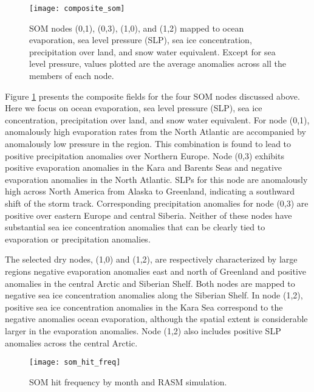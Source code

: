 \begin{figure}
  \centering
  \texttt{[image: composite\_som]}
  \caption{SOM nodes (0,1), (0,3), (1,0), and (1,2) mapped to ocean evaporation, sea level pressure (SLP), sea ice concentration, precipitation over land, and snow water equivalent. Except for sea level pressure, values plotted are the average anomalies across all the members of each node.}
  \label{fig:composite_som}
\end{figure}

Figure \ref{fig:composite_som} presents the composite fields for the four SOM nodes discussed above.
Here we focus on ocean evaporation, sea level pressure (SLP), sea ice concentration, precipitation over land, and snow water equivalent.
For node (0,1), anomalously high evaporation rates from the North Atlantic are accompanied by anomalously low pressure in the region.
This combination is found to lead to positive precipitation anomalies over Northern Europe.
Node (0,3) exhibits positive evaporation anomalies in the Kara and Barents Seas and negative evaporation anomalies in the North Atlantic.
SLPs for this node are anomalously high across North America from Alaska to Greenland, indicating a southward shift of the storm track.
Corresponding precipitation anomalies for node (0,3) are positive over eastern Europe and central Siberia.
Neither of these nodes have substantial sea ice concentration anomalies that can be clearly tied to evaporation or precipitation anomalies.  %

The selected dry nodes, (1,0) and (1,2), are respectively characterized by large regions negative evaporation anomalies east and north of Greenland and positive anomalies in the central Arctic and Siberian Shelf.
Both nodes are mapped to negative sea ice concentration anomalies along the Siberian Shelf.
In node (1,2), positive sea ice concentration anomalies in the Kara Sea correspond to the negative anomalies ocean evaporation, although the spatial extent is considerable larger in the evaporation anomalies.
Node (1,2) also includes positive SLP anomalies across the central Arctic.

\begin{figure}
  \centering
  \texttt{[image: som\_hit\_freq]}
  \caption{SOM hit frequency by month and RASM simulation.}
  \label{fig:som_hit_freq}
\end{figure}


